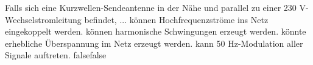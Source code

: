     {Falls sich eine Kurzwellen-Sendeantenne in der Nähe und parallel zu einer 230 V-Wechselstromleitung befindet, ...}
    {können Hochfrequenzströme ins Netz eingekoppelt werden.}
    {können harmonische Schwingungen erzeugt werden.}
    {könnte erhebliche Überspannung im Netz erzeugt werden.}
    {kann 50 Hz-Modulation aller Signale auftreten.}
    {false}{false}